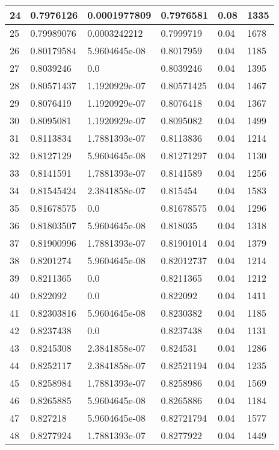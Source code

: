 \begin{longtable}{|l|l|l|l|l|l|}
24 & 0.7976126 & 0.0001977809 & 0.7976581 & 0.08 & 1335 \\ \hline 
25 & 0.79989076 & 0.0003242212 & 0.7999719 & 0.04 & 1678 \\ \hline 
26 & 0.80179584 & 5.9604645e-08 & 0.8017959 & 0.04 & 1185 \\ \hline 
27 & 0.8039246 & 0.0 & 0.8039246 & 0.04 & 1395 \\ \hline 
28 & 0.80571437 & 1.1920929e-07 & 0.80571425 & 0.04 & 1467 \\ \hline 
29 & 0.8076419 & 1.1920929e-07 & 0.8076418 & 0.04 & 1367 \\ \hline 
30 & 0.8095081 & 1.1920929e-07 & 0.8095082 & 0.04 & 1499 \\ \hline 
31 & 0.8113834 & 1.7881393e-07 & 0.8113836 & 0.04 & 1214 \\ \hline 
32 & 0.8127129 & 5.9604645e-08 & 0.81271297 & 0.04 & 1130 \\ \hline 
33 & 0.8141591 & 1.7881393e-07 & 0.8141589 & 0.04 & 1256 \\ \hline 
34 & 0.81545424 & 2.3841858e-07 & 0.815454 & 0.04 & 1583 \\ \hline 
35 & 0.81678575 & 0.0 & 0.81678575 & 0.04 & 1296 \\ \hline 
36 & 0.81803507 & 5.9604645e-08 & 0.818035 & 0.04 & 1318 \\ \hline 
37 & 0.81900996 & 1.7881393e-07 & 0.81901014 & 0.04 & 1379 \\ \hline 
38 & 0.8201274 & 5.9604645e-08 & 0.82012737 & 0.04 & 1214 \\ \hline 
39 & 0.8211365 & 0.0 & 0.8211365 & 0.04 & 1212 \\ \hline 
40 & 0.822092 & 0.0 & 0.822092 & 0.04 & 1411 \\ \hline 
41 & 0.82303816 & 5.9604645e-08 & 0.8230382 & 0.04 & 1185 \\ \hline 
42 & 0.8237438 & 0.0 & 0.8237438 & 0.04 & 1131 \\ \hline 
43 & 0.8245308 & 2.3841858e-07 & 0.824531 & 0.04 & 1286 \\ \hline 
44 & 0.8252117 & 2.3841858e-07 & 0.82521194 & 0.04 & 1235 \\ \hline 
45 & 0.8258984 & 1.7881393e-07 & 0.8258986 & 0.04 & 1569 \\ \hline 
46 & 0.8265885 & 5.9604645e-08 & 0.8265886 & 0.04 & 1184 \\ \hline 
47 & 0.827218 & 5.9604645e-08 & 0.82721794 & 0.04 & 1577 \\ \hline 
48 & 0.8277924 & 1.7881393e-07 & 0.8277922 & 0.04 & 1449 \\ \hline 

\end{longtable}

